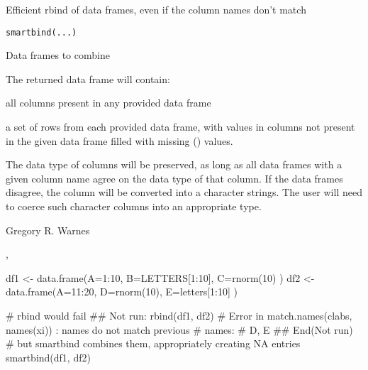\begin{Description}\relax
Efficient rbind of data frames, even if the column names don't match
\end{Description}
\begin{Usage}
\begin{verbatim}
smartbind(...)
\end{verbatim}
\end{Usage}
\begin{Arguments}
\begin{ldescription}
\item[\code{...}] Data frames to combine
\end{ldescription}
\end{Arguments}
\begin{Value}
The returned data frame will contain:
\begin{ldescription}
\item[\code{columns}] all columns present in any provided data frame
\item[\code{rows}] a set of rows from each provided data frame, with values
in columns not present in the given data frame filled with missing
() values.
\end{ldescription}

The data type of columns will be preserved, as long as all data frames
with a given column name agree on the data type of that column.  If
the data frames disagree, the column will be converted into a
character strings.  The user will need to coerce such character
columns into an appropriate type.
\end{Value}
\begin{Author}\relax
Gregory R. Warnes 
\end{Author}
\begin{SeeAlso}\relax
{}, 
\end{SeeAlso}
\begin{Examples}
\begin{ExampleCode}

  df1 <- data.frame(A=1:10, B=LETTERS[1:10], C=rnorm(10) )
  df2 <- data.frame(A=11:20, D=rnorm(10), E=letters[1:10] )

  # rbind would fail
## Not run: 
  rbind(df1, df2)
  # Error in match.names(clabs, names(xi)) : names do not match previous
  # names:
  #     D, E
## End(Not run)
  # but smartbind combines them, appropriately creating NA entries
  smartbind(df1, df2)


\end{ExampleCode}
\end{Examples}

